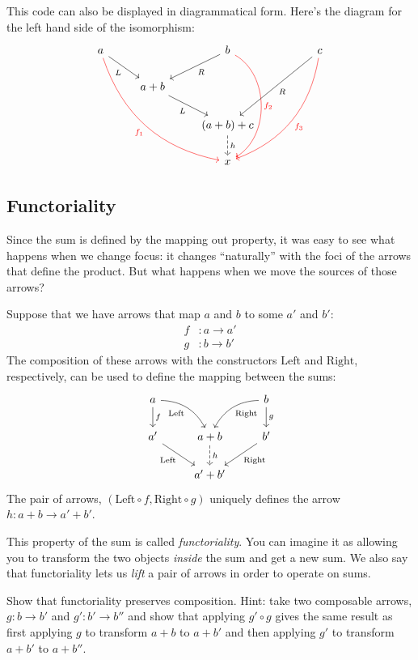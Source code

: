 \documentclass[DaoFP]{subfiles}
\begin{document}
This code can also be displayed in diagrammatical form. Here's the diagram for the left hand side of the isomorphism:
\[
 \begin{tikzcd}
 a
 \arrow[rd, "L"']
 \arrow[rrddd, bend right, red, "f_1"']
 && b
 \arrow[ld, "R"]
 \arrow[ddd, bend left=60, red, "f_2"]
&&c
 \arrow[lldd, "R"]
 \arrow[llddd, bend left, red, "f_3"]
 \\
 & a + b
  \arrow[rd, "L"']
 \\
&&(a + b) + c
 \arrow[d, dashed, "h"]
\\
&& x
 \end{tikzcd}
\]
\subsection{Functoriality}
Since the sum is defined by the mapping out property, it was easy to see what happens when we change focus: it changes ``naturally'' with the foci of the arrows that define the product. But what happens when we move the sources of those arrows? 

Suppose that we have arrows that map $a$ and $b$ to some $a'$ and $b'$:
\begin{align*}f &\colon a \to a' \\
g &\colon b \to b' 
\end{align*}
The composition of these arrows with the constructors $\text{Left}$ and $\text{Right}$, respectively, can be used to define the mapping between the sums:
\[
 \begin{tikzcd}
 a
 \arrow[d, "f"]
 \arrow[dr,  bend left, "\text{Left}"']
  && b
 \arrow[d, "g"]
 \arrow[dl, bend right, "\text{Right}"]
 \\
 a'
 \arrow[rd, "\text{Left}"']
&a + b
\arrow[d, dashed, "h"]
& b'
\arrow[ld, "\text{Right}"]
\\
& a' + b'
 \end{tikzcd}
\]
The pair of arrows, $(\text{Left} \circ f, \text{Right} \circ g)$ uniquely defines the arrow $h \colon a + b \to a' + b'$.

This property of the sum is called \emph{functoriality}. You can imagine it as allowing you to transform the two objects \emph{inside} the sum and get a new sum. We also say that functoriality lets us \emph{lift} a pair of arrows in order to operate on sums.

\begin{exercise}
Show that functoriality preserves composition. Hint: take two composable arrows, $g \colon b \to b'$ and $g' \colon b' \to b''$ and show that applying $g' \circ g$ gives the same result as first applying $g$ to transform $a + b$ to $a + b'$ and then applying $g'$ to transform $a + b'$ to $a + b''$.
\end{exercise}
\end{document}
